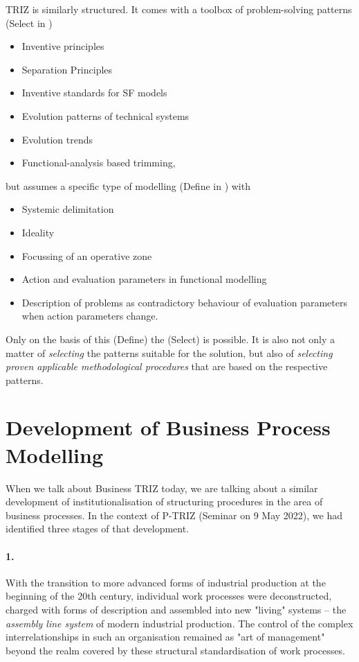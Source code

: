 \documentclass[11pt,a4paper]{article}
\begin{document}
TRIZ is similarly structured. It comes with a toolbox of problem-solving
patterns (Select in \cite{Mann})
\begin{itemize}
\item Inventive principles
\item Separation Principles
\item Inventive standards for SF models
\item Evolution patterns of technical systems
\item Evolution trends
\item Functional-analysis based trimming,
\end{itemize}
but assumes a specific type of modelling (Define in \cite{Mann}) with
\begin{itemize}
\item Systemic delimitation
\item Ideality
\item Focussing of an operative zone
\item Action and evaluation parameters in functional modelling
\item Description of problems as contradictory behaviour of evaluation
  parameters when action parameters change.
\end{itemize}
Only on the basis of this (Define) the (Select) is possible. It is also not
only a matter of \emph{selecting} the patterns suitable for the solution, but
also of \emph{selecting proven applicable methodological procedures} that are
based on the respective patterns.
\newpage

\section{Development of Business Process Modelling}

When we talk about Business TRIZ today, we are talking about a similar
development of institutionalisation of structuring procedures in the area of
business processes.  In the context of P-TRIZ (Seminar on 9 May 2022), we had
identified three stages of that development.

\paragraph{1.}
With the transition to more advanced forms of industrial production at the
beginning of the 20th century, individual work processes were deconstructed,
charged with forms of description and assembled into new "living" systems --
the \emph{assembly line system} of modern industrial production. The control
of the complex interrelationships in such an organisation remained as "art of
management" beyond the realm covered by these structural standardisation of
work processes.
\end{document}
